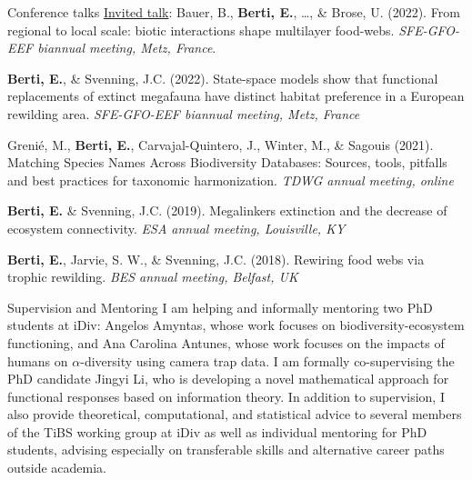 \documentclass{resume} %
\begin{document}
\begin{rSection}{Conference talks}
\underline{Invited talk}: Bauer, B., \textbf{Berti, E.}, \dots, \& Brose, U. (2022). From regional to local scale: biotic interactions shape multilayer food-webs. \textit{SFE-GFO-EEF biannual meeting, Metz, France}.

\textbf{Berti, E.}, \& Svenning, J.C. (2022). State-space models show that functional replacements of extinct megafauna have distinct habitat preference in a European rewilding area. \textit{SFE-GFO-EEF biannual meeting, Metz, France}

Grenié, M., \textbf{Berti, E.}, Carvajal-Quintero, J., Winter, M., \& Sagouis (2021). Matching Species Names Across Biodiversity Databases: Sources, tools, pitfalls and best practices for taxonomic harmonization. \textit{TDWG annual meeting, online}

\textbf{Berti, E.} \& Svenning, J.C. (2019). Megalinkers extinction and the decrease of ecosystem connectivity. \textit{ESA annual meeting, Louisville, KY}

\textbf{Berti, E.}, Jarvie, S. W., \& Svenning, J.C. (2018). Rewiring food webs via trophic rewilding. \textit{BES annual meeting, Belfast, UK}
\end{rSection}

\begin{rSection}{Supervision and Mentoring}
I am helping and informally mentoring two PhD students at iDiv: Angelos Amyntas, whose work focuses on biodiversity-ecosystem functioning, and Ana Carolina Antunes, whose work focuses on the impacts of humans on $\alpha$-diversity using camera trap data. I am formally co-supervising the PhD candidate Jingyi Li, who is developing a novel mathematical approach for functional responses based on information theory. In addition to supervision, I also provide theoretical, computational, and statistical advice to several members of the TiBS working group at iDiv as well as individual mentoring for PhD students, advising especially on transferable skills and alternative career paths outside academia.
\end{rSection}
\end{document}
